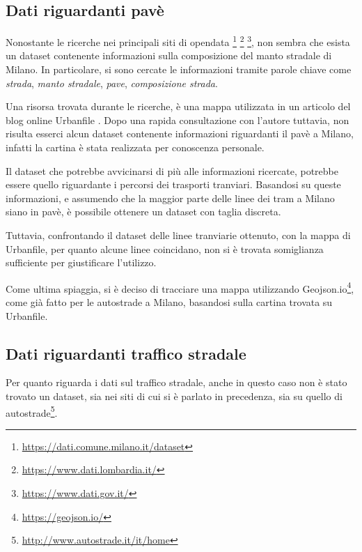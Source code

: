 \documentclass[a4paper,12pt]{report}
\newcommand{\quotestyle}[1]{\textit{#1}}
\begin{document}
\subsection{Dati riguardanti pavè}

Nonostante le ricerche nei principali siti di opendata
\footnote{\url{https://dati.comune.milano.it/dataset}}
\footnote{\url{https://www.dati.lombardia.it/}}
\footnote{\url{https://www.dati.gov.it/}}, 
non sembra che esista un dataset contenente informazioni sulla composizione del 
manto stradale di Milano. 
In particolare, si sono cercate le informazioni tramite parole chiave come 
\quotestyle{strada}, \quotestyle{manto stradale}, \quotestyle{pave}, 
\quotestyle{composizione strada}.

Una risorsa trovata durante le ricerche, è una mappa utilizzata in un articolo del blog online 
Urbanfile \cite{URBANFILE:1}. 
Dopo una rapida consultazione con l'autore tuttavia, non risulta esserci alcun 
dataset contenente informazioni riguardanti il pavè a Milano, infatti la cartina è 
stata realizzata per conoscenza personale.

Il dataset che potrebbe avvicinarsi di più alle informazioni ricercate, 
potrebbe essere quello riguardante i percorsi dei trasporti tranviari. 
Basandosi su queste informazioni, e assumendo che la maggior parte delle linee dei 
tram a Milano siano in pavè, è possibile ottenere un dataset con taglia discreta.

Tuttavia, confrontando il dataset delle linee tranviarie ottenuto, 
con la mappa di Urbanfile, per quanto alcune linee coincidano, non si è trovata 
somiglianza sufficiente per giustificare l'utilizzo.

Come ultima spiaggia, si è deciso di tracciare una mappa utilizzando 
Geojson.io\footnote{\url{https://geojson.io/}}, come già fatto per le autostrade a Milano, 
basandosi sulla cartina trovata su Urbanfile. 

\subsection{Dati riguardanti traffico stradale}

Per quanto riguarda i dati sul traffico stradale, anche in questo caso non è stato trovato un 
dataset, sia nei siti di cui si è parlato in precedenza, sia su quello di 
autostrade\footnote{\url{http://www.autostrade.it/it/home}}.
\end{document}

